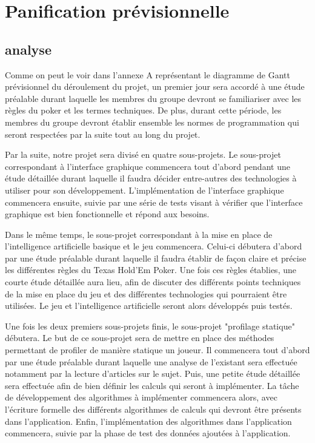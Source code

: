 \documentclass{report}
\begin{document}
\chapter{Panification prévisionnelle}
\section{analyse}
\hspace{0.5cm}Comme on peut le voir dans l'annexe A représentant le diagramme de Gantt prévisionnel du déroulement du projet, un premier jour sera accordé à une étude préalable durant laquelle les membres du groupe devront se familiariser avec les règles du poker et les termes techniques. De plus, durant cette période, les membres du groupe devront établir ensemble les normes de programmation qui seront respectées par la suite tout au long du projet.\par
Par la suite, notre projet sera divisé en quatre sous-projets. 
Le sous-projet correspondant à l'interface graphique commencera tout d'abord pendant une étude détaillée durant laquelle il faudra décider entre-autres des technologies à utiliser pour son développement. L'implémentation de l'interface graphique commencera ensuite, suivie par une série de tests visant à vérifier que l'interface graphique est bien fonctionnelle et répond aux besoins. \par
Dans le même temps, le sous-projet correspondant à la mise en place de l'intelligence artificielle basique et le jeu commencera. Celui-ci débutera d'abord par une étude préalable durant laquelle il faudra établir de façon claire et précise les différentes règles du Texas Hold'Em Poker. Une fois ces règles établies, une courte étude détaillée aura lieu, afin de discuter des différents points techniques de la mise en place du jeu et des différentes technologies qui pourraient être utilisées. Le jeu et l'intelligence artificielle seront alors développés puis testés.\par
Une fois les deux premiers sous-projets finis, le sous-projet "profilage statique" débutera. Le but de ce sous-projet sera de mettre en place des méthodes permettant de profiler de manière statique un joueur. Il commencera tout d'abord par une étude préalable durant laquelle une analyse de l'existant sera effectuée notamment par la lecture d'articles sur le sujet. Puis, une petite étude détaillée sera effectuée afin de bien définir les calculs qui seront à implémenter. La tâche de développement des algorithmes à implémenter commencera alors, avec l'écriture formelle des différents algorithmes de calculs qui devront être présents dans l'application. Enfin, l'implémentation des algorithmes dans l'application commencera, suivie par la phase de test des données ajoutées à l'application. \par
\end{document}
